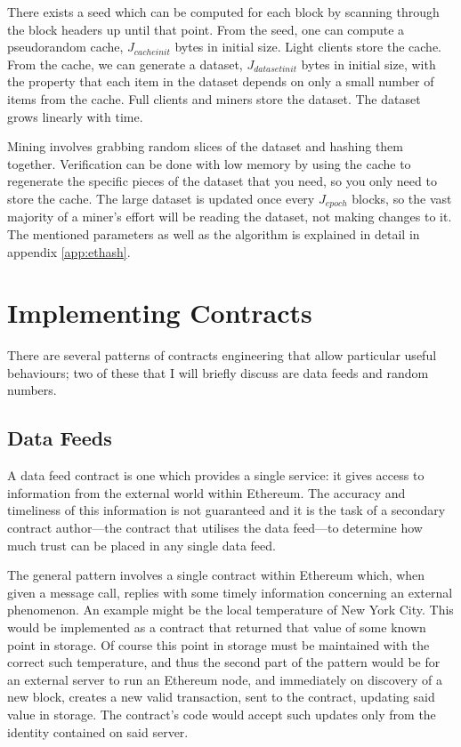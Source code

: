 \documentclass[9pt,oneside]{amsart}
\begin{document}
\begin{multicols}{2}
There exists a seed which can be computed for each block by scanning through the block headers up until that point. From the seed, one can compute a pseudorandom cache, $J_{cacheinit}$ bytes in initial size. Light clients store the cache. From the cache, we can generate a dataset, $J_{datasetinit}$ bytes in initial size, with the property that each item in the dataset depends on only a small number of items from the cache. Full clients and miners store the dataset. The dataset grows linearly with time.

Mining involves grabbing random slices of the dataset and hashing them together. Verification can be done with low memory by using the cache to regenerate the specific pieces of the dataset that you need, so you only need to store the cache. The large dataset is updated once every $J_{epoch}$ blocks, so the vast majority of a miner's effort will be reading the dataset, not making changes to it. The mentioned parameters as well as the algorithm is explained in detail in appendix \ref{app:ethash}.

\section{Implementing Contracts}

There are several patterns of contracts engineering that allow particular useful behaviours; two of these that I will briefly discuss are data feeds and random numbers.

\subsection{Data Feeds}
A data feed contract is one which provides a single service: it gives access to information from the external world within Ethereum. The accuracy and timeliness of this information is not guaranteed and it is the task of a secondary contract author---the contract that utilises the data feed---to determine how much trust can be placed in any single data feed.

The general pattern involves a single contract within Ethereum which, when given a message call, replies with some timely information concerning an external phenomenon. An example might be the local temperature of New York City. This would be implemented as a contract that returned that value of some known point in storage. Of course this point in storage must be maintained with the correct such temperature, and thus the second part of the pattern would be for an external server to run an Ethereum node, and immediately on discovery of a new block, creates a new valid transaction, sent to the contract, updating said value in storage. The contract's code would accept such updates only from the identity contained on said server.


\end{multicols}
\end{document}
